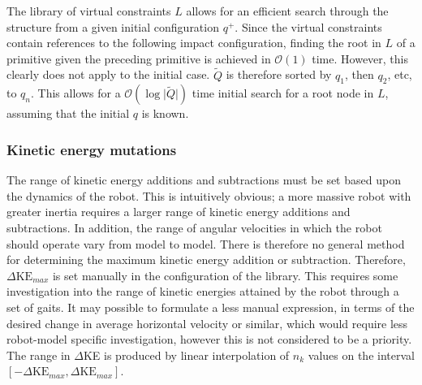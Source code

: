 The library of virtual constraints $L$ allows for an efficient search through the structure from a given initial configuration $q^+$. Since the virtual constraints contain references to the following impact configuration, finding the root in $L$ of a primitive given the preceding primitive is achieved in $\mathcal{O}(1)$ time. However, this clearly does not apply to the initial case. $\tilde{Q}$ is therefore sorted by $q_1$, then $q_2$, etc, to $q_n$. This allows for a $\mathcal{O}(\log\lvert\tilde{Q}\rvert)$ time initial search for a root node in $L$, assuming that the initial $q$ is known.

\subsubsection{Kinetic energy mutations}
The range of kinetic energy additions and subtractions must be set based upon the dynamics of the robot. This is intuitively obvious; a more massive robot with greater inertia requires a larger range of kinetic energy additions and subtractions. In addition, the range of angular velocities in which the robot should operate vary from model to model. There is therefore no general method for determining the maximum kinetic energy addition or subtraction. Therefore, $\Delta\mathrm{KE}_{max}$ is set manually in the configuration of the library. This requires some investigation into the range of kinetic energies attained by the robot through a set of gaits. It may possible to formulate a less manual expression, in terms of the desired change in average horizontal velocity or similar, which would require less robot-model specific investigation, however this is not considered to be a priority. The range in $\Delta$KE is produced by linear interpolation of $n_k$ values on the interval $[-\Delta\mathrm{KE}_{max},\Delta\mathrm{KE}_{max}]$.

